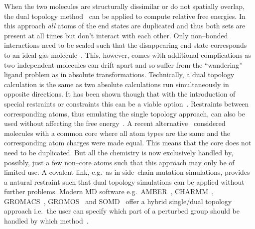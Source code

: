 \documentclass[journal=jctcce,manuscript=article]{achemso}
\begin{document}
When the two molecules are structurally dissimilar or do not spatially overlap, 
the dual topology method~\cite{doi:10.1021/j100056a020, doi:10.1021/jp981628n} 
can be applied to compute relative free energies.  In this approach \emph{all} 
atoms of the end states are duplicated and thus both sets are present at all
times but don't interact with each other.  Only non--bonded
interactions need to be scaled such that the disappearing end state
corresponds to an ideal gas molecule~\cite{doi:10.1021/jp981628n}.
This, however, comes with additional complications as two independent
molecules can drift apart and so suffer from the ``wandering'' ligand
problem as in absolute transformations\cite{GILSON19971047,
doi:10.1021/jp0217839, deng_computations_2009}.  Technically, a dual topology 
calculation is the same as two absolute calculations run simultaneously in 
opposite directions.  It has been shown though that with the introduction of 
special restraints or constraints this can be a viable 
option~\cite{doi:10.1021/ct700081t,
  rocklin_separated_2013, JCC:Axelsen-Li}.  Restraints between 
corresponding atoms, thus emulating the single topology approach, can also be 
used without affecting the free energy~\cite{JCC:Axelsen-Li}.  A recent 
alternative~\cite{doi:10.1021/acs.jctc.5b00179} considered molecules with a
common core where all atom types are the same and the corresponding atom 
charges were made equal.  This means that the core does not need to be 
duplicated.  But all the chemistry is now exclusively handled by, possibly, 
just a few non--core atoms such that this approach may only be of limited use.
A covalent link, e.g.\ as in side--chain
mutation simulations, provides a natural restraint such that dual
topology simulations can be applied without further problems.  Modern
MD software e.g.\ AMBER~\cite{case_amber_2005},
CHARMM~\cite{JCC:JCC21287}, GROMACS~\cite{Abraham201519},
GROMOS~\cite{doi:10.1021/jp984217f} and SOMD~\cite{Sire-2016,
  doi:10.1021/ct300857j}
offer a hybrid single/dual topology approach
i.e.\ the user can specify which part of a perturbed group should be
handled by which method~\cite{doi:10.1021/jp994193s}.
\end{document}
